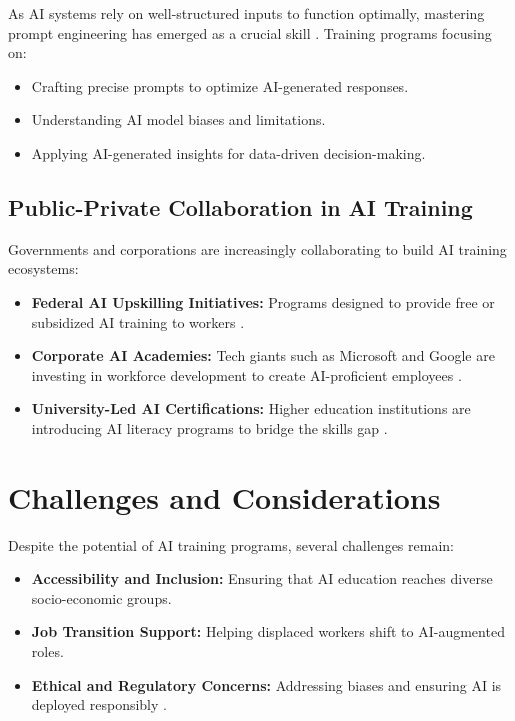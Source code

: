 \documentclass[a4paper,headinclude=on,footinclude=on,12pt,oneside]{scrbook}
\begin{document}
As AI systems rely on well-structured inputs to function optimally, mastering prompt engineering has emerged as a crucial skill \cite{EffectiveAIPrompting, PromptingAIChatbots}. Training programs focusing on:
\begin{itemize}
	\item Crafting precise prompts to optimize AI-generated responses.
	\item Understanding AI model biases and limitations.
	\item Applying AI-generated insights for data-driven decision-making.
\end{itemize}

\subsection{Public-Private Collaboration in AI Training}

Governments and corporations are increasingly collaborating to build AI training ecosystems:
\begin{itemize}
	\item \textbf{Federal AI Upskilling Initiatives:} Programs designed to provide free or subsidized AI training to workers \cite{InstructionalDesignDelivery}.
	\item \textbf{Corporate AI Academies:} Tech giants such as Microsoft and Google are investing in workforce development to create AI-proficient employees \cite{MicrosoftCopilotAI}.
	\item \textbf{University-Led AI Certifications:} Higher education institutions are introducing AI literacy programs to bridge the skills gap \cite{chriscarmichaelLibraryGuidesGuideArtificial}.
\end{itemize}

\section{Challenges and Considerations}

Despite the potential of AI training programs, several challenges remain:
\begin{itemize}
	\item \textbf{Accessibility and Inclusion:} Ensuring that AI education reaches diverse socio-economic groups.
	\item \textbf{Job Transition Support:} Helping displaced workers shift to AI-augmented roles.
	\item \textbf{Ethical and Regulatory Concerns:} Addressing biases and ensuring AI is deployed responsibly \cite{StudentPGRGuidance}.
\end{itemize}
\end{document}
